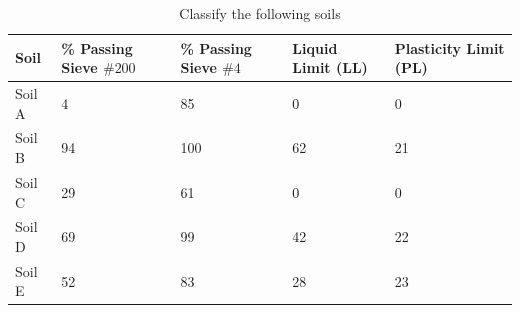 \documentclass[a4paper,12pt]{article}
\begin{document}
\begin{enumerate}
	
	\begin{table}[!h]
		\caption{Classify the following soils}
		\label{table:classify}
		\centering
		\begin{tabular}{lp{3cm}p{3cm}p{2cm}p{2cm}}
			\toprule
			\textbf{Soil} & \textbf{\% Passing Sieve $\#200$} & \textbf{\% Passing Sieve $\#4$} & \textbf{Liquid Limit (LL)} & \textbf{Plasticity Limit (PL)} \\
			\midrule
			Soil A & 4  & 85  & 0  & 0  \\
			Soil B & 94 & 100 & 62 & 21 \\
			Soil C & 29 & 61  & 0  & 0  \\
			Soil D & 69 & 99  & 42 & 22 \\
			Soil E & 52 & 83  & 28 & 23 \\
			\bottomrule
		\end{tabular}
	\end{table}


\end{enumerate}
\end{document}

